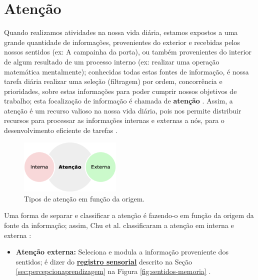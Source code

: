 \section{Atenção}
\label{sec:atencao}
Quando realizamos atividades na nossa vida diária, 
estamos expostos a uma grande quantidade de informações, 
provenientes do exterior e recebidas pelos nossos sentidos (ex: A campainha da porta),
ou também provenientes do interior de algum resultado de um processo interno 
(ex: realizar uma operação matemática mentalmente);
conhecidas todas estas fontes de informação,
é nossa tarefa diária realizar uma seleção (filtragem) por ordem, concorrência e prioridades,
sobre estas informações para poder cumprir nossos objetivos de trabalho;
esta focalização de informação é chamada de \textbf{atenção} \cite[pp. 99]{pake2019psicologia}.
Assim, a atenção é um recurso valioso na nossa vida diária, 
pois nos permite distribuir recursos para processar as informações internas e externas
a nós, para o desenvolvimento eficiente de tarefas \cite[pp. 155]{eysenck2017manual}. 

\begin{figure}
  \vspace{-20pt}
  \centering
  \includegraphics[width=0.435\textwidth]{chapters/cap-learning/attention2.eps}
  \vspace{-10pt}
\caption{Tipos de atenção em função da origem.}
\label{fig:attention2}
\end{figure}
Uma forma de separar e classificar  a atenção é fazendo-o
em função da origem da fonte da informação;
assim, Chu et al. classificaram a atenção em interna e externa \cite{ExternalInternalAttention} \cite[pp. 155]{eysenck2017manual}:
\begin{itemize}
\item \textbf{Atenção externa:} 
Seleciona e modula a informação proveniente dos sentidos;
é dizer do \hyperref[sec:percepcionaprendizagem]{\textbf{registro sensorial}}
descrito na Seção \ref{sec:percepcionaprendizagem} na Figura \ref{fig:sentidos-memoria}
\cite{ExternalInternalAttention} \cite[pp. 155]{eysenck2017manual}.
\end{itemize}

